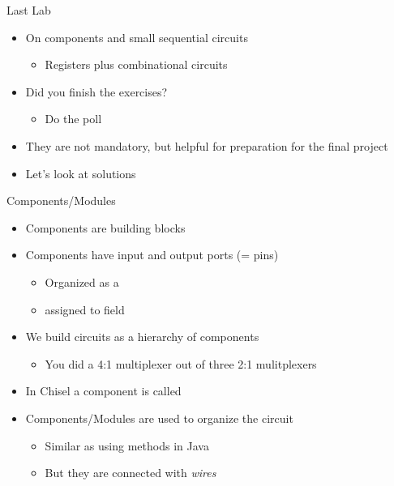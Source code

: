 \begin{frame}[fragile]{Last Lab}
\begin{itemize}
\item On components and small sequential circuits
\begin{itemize}
\item Registers plus combinational circuits
\end{itemize}
\item Did you finish the exercises?
\begin{itemize}
\item Do the poll
\end{itemize}
\item They are not mandatory, but helpful for preparation for the final project
\item Let's look at solutions
\end{itemize}
\end{frame}

\begin{frame}[fragile]{Components/Modules}
\begin{itemize}
\item Components are building blocks
\item Components have input and output ports (= pins)
\begin{itemize}
\item Organized as a 
\item assigned to field 
\end{itemize}
\item We build circuits as a hierarchy of components
\begin{itemize}
\item You did a 4:1 multiplexer out of three 2:1 mulitplexers
\end{itemize}
\item In Chisel a component is called 
\item Components/Modules are used to organize the circuit
\begin{itemize}
\item Similar as using methods in Java
\item But they are connected with \emph{wires}
\end{itemize}
\end{itemize}
\end{frame}



